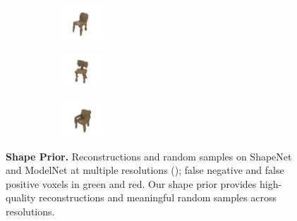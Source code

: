 \begin{figure}[tp]
{\begin{subfigure}[t]{0.5\textwidth}
\begin{subfigure}[t]{0.15\textwidth}
	    \end{subfigure}
	    \begin{subfigure}[t]{0.15\textwidth}
   	    	\vspace{0px}\centering
   	       	\includegraphics[width=1.5cm,trim={\cropleft cm \croplower cm \cropright cm \cropupper cm},clip]{gexp_clean_chair_high_10_wide_d_prior_3_3_random_results_1}
	    \end{subfigure}
	    \begin{subfigure}[t]{0.15\textwidth}
   	    	\vspace{0px}\centering
   	       	\includegraphics[width=1.5cm,trim={\cropleft cm \croplower cm \cropright cm \cropupper cm},clip]{gexp_clean_chair_high_10_wide_d_prior_3_3_random_results_0}
	    \end{subfigure}
	    \begin{subfigure}[t]{0.15\textwidth}
   	    	\vspace{0px}\centering
   	       	\includegraphics[width=1.5cm,trim={\cropleft cm \croplower cm \cropright cm \cropupper cm},clip]{gexp_clean_chair_high_10_wide_d_prior_3_3_random_results_3}
	    \end{subfigure}
    \end{subfigure}
    }

    \vspace*{-\figskipcaption px}
    \caption{{\bf \DVAE Shape Prior.} Reconstructions and random samples on ShapeNet and ModelNet at multiple resolutions (\cf {}); false negative and false positive voxels in {\color{rgreen}green} and {\color{rred}red}. Our \DVAE shape prior provides high-quality reconstructions and meaningful random samples across resolutions.}
    \label{fig:results-shape-prior}
    \vspace*{-\figskipbelow px}
\end{figure}